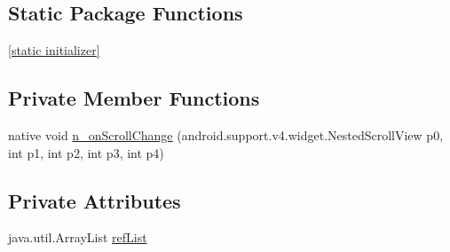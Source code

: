 \subsection*{Static Package Functions}
\begin{CompactItemize}
\item 
\hyperlink{classmono_1_1android_1_1support_1_1v4_1_1widget_1_1_nested_scroll_view___on_scroll_change_listener_implementor_9c454b973f05a4ef258fa7af4fcc1ab1}{\mbox{[}static initializer\mbox{]}}
\end{CompactItemize}
\subsection*{Private Member Functions}
\begin{CompactItemize}
\item 
native void \hyperlink{classmono_1_1android_1_1support_1_1v4_1_1widget_1_1_nested_scroll_view___on_scroll_change_listener_implementor_29827e9faa7e0ddab1f71db351c1c83a}{n\_\-onScrollChange} (android.support.v4.widget.NestedScrollView p0, int p1, int p2, int p3, int p4)
\end{CompactItemize}
\subsection*{Private Attributes}
\begin{CompactItemize}
\item 
java.util.ArrayList \hyperlink{classmono_1_1android_1_1support_1_1v4_1_1widget_1_1_nested_scroll_view___on_scroll_change_listener_implementor_ecec2c3cb0d44ea181166dd62953da94}{refList}
\end{CompactItemize}


